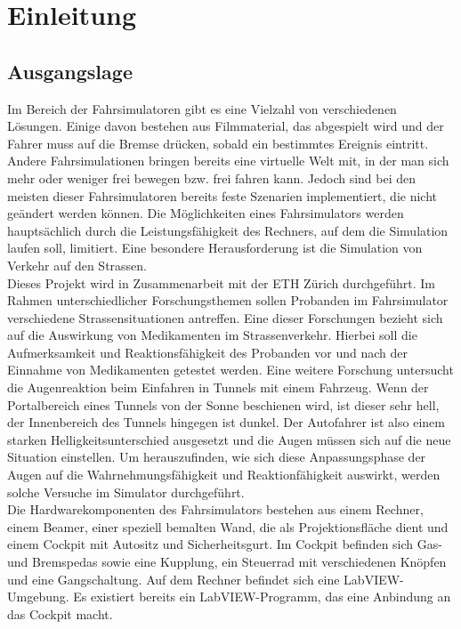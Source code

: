 \section{Einleitung}
\subsection{Ausgangslage}

Im Bereich der Fahrsimulatoren gibt es eine Vielzahl von verschiedenen Lösungen. Einige davon bestehen aus Filmmaterial, das abgespielt wird und der Fahrer muss auf die Bremse drücken, sobald ein bestimmtes Ereignis eintritt. Andere Fahrsimulationen bringen bereits eine virtuelle Welt mit, in der man sich mehr oder weniger frei bewegen bzw. frei fahren kann. Jedoch sind bei den meisten dieser Fahrsimulatoren bereits feste Szenarien implementiert, die  nicht geändert werden können. Die Möglichkeiten eines Fahrsimulators werden hauptsächlich durch die Leistungsfähigkeit des Rechners, auf dem die Simulation laufen soll, limitiert. Eine besondere Herausforderung ist die Simulation von Verkehr auf den Strassen. \\
Dieses Projekt wird in Zusammenarbeit mit der ETH Zürich durchgeführt. Im Rahmen unterschiedlicher Forschungsthemen sollen Probanden im Fahrsimulator verschiedene Strassensituationen antreffen. Eine dieser Forschungen bezieht sich auf die Auswirkung von Medikamenten im Strassenverkehr. Hierbei soll die Aufmerksamkeit und Reaktionsfähigkeit des Probanden vor und nach der Einnahme von Medikamenten getestet werden. Eine weitere Forschung untersucht die Augenreaktion beim Einfahren in Tunnels mit einem Fahrzeug. Wenn der Portalbereich eines Tunnels von der Sonne beschienen wird, ist dieser sehr hell, der Innenbereich des Tunnels hingegen ist dunkel. Der Autofahrer ist also einem starken Helligkeitsunterschied ausgesetzt und die Augen müssen sich auf die neue Situation einstellen. Um herauszufinden, wie sich diese Anpassungsphase der Augen auf die Wahrnehmungsfähigkeit und Reaktionfähigkeit auswirkt, werden solche Versuche im Simulator durchgeführt. \\
Die Hardwarekomponenten des Fahrsimulators bestehen aus einem Rechner, einem Beamer, einer speziell bemalten Wand, die als Projektionsfläche dient und einem Cockpit mit Autositz und Sicherheitsgurt. Im Cockpit befinden sich Gas- und Bremspedas sowie eine Kupplung, ein Steuerrad mit verschiedenen Knöpfen und eine Gangschaltung. Auf dem Rechner befindet sich eine LabVIEW-Umgebung. Es existiert bereits ein LabVIEW-Programm, das eine Anbindung an das Cockpit macht.

